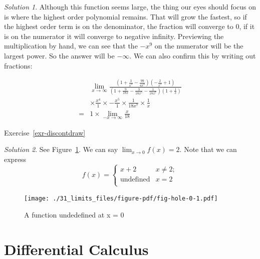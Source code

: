 \documentclass[
  letterpaper,
]{book}
\theoremstyle{definition}
\theoremstyle{definition}
\theoremstyle{plain}
\theoremstyle{definition}
\theoremstyle{plain}
\theoremstyle{plain}
\theoremstyle{remark}
\newtheorem*{solution}{Solution}
\begin{document}
\begin{solution}

Although this function seems large, the thing our eyes should focus on
is where the highest order polynomial remains. That will grow the
fastest, so if the highest order term is on the denominator, the
fraction will converge to 0, if it is on the numerator it will converge
to negative infinity. Previewing the multiplication by hand, we can see
that the \(-x^9\) on the numerator will be the largest power. So the
answer will be \(-\infty\). We can also confirm this by writing out
fractions:

\[\begin{align*}  
& \lim_{x\to\infty}\frac{\left(1 + \frac{3}{x^3} - \frac{99}{4x^4}\right)\left(-\frac{2}{x^5} + 1\right)}{\left(1 + \frac{9}{18x} - \frac{3}{18x^5} - \frac{1}{18x^7} \right)\left(1 + \frac{1}{x}\right)} \\
&\times \frac{x^4}{1} \times -\frac{x^5}{1} \times \frac{1}{18x^7}\times \frac{1}{x}\\
=& 1 \times \lim_{-x\to\infty} \frac{x}{18}
\end{align*}\]

\end{solution}

Exercise~\ref{exr-discontdraw}

\begin{solution}

See Figure~\ref{fig-hole-0}. We can say \(\lim_{x\to 0}f(x) = 2\). Note
that we can express \[f(x) = 
    \left\{
    \begin{array}{ll}
        x+2 & x \neq 2; \\
        \textrm{undefined} & x = 2 \\
    \end{array} 
    \right.\]

\end{solution}

\begin{figure}

{\centering \texttt{[image: ./31\_limits\_files/figure-pdf/fig-hole-0-1.pdf]}

}

\caption{\label{fig-hole-0}A function undedefined at x = 0}

\end{figure}

\hypertarget{derivatives}{%
\chapter{Differential Calculus}\label{derivatives}}
\end{document}
